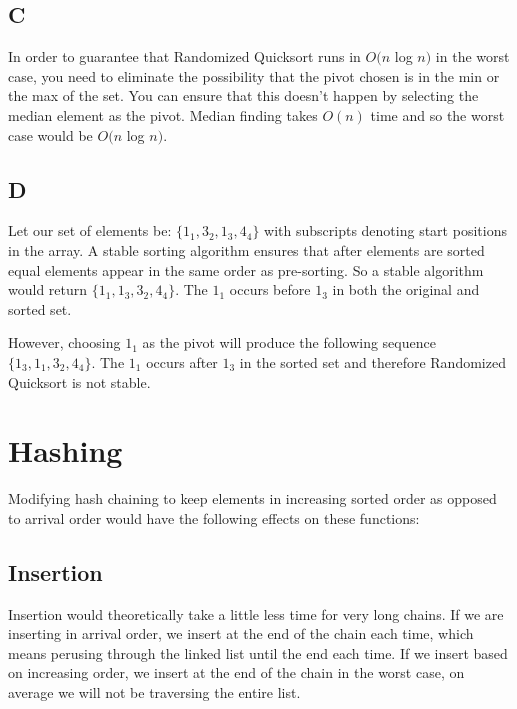 \documentclass[12pt]{article}
\begin{document}
\pagebreak

\subsection{C}

In order to guarantee that Randomized Quicksort runs in $O(n$ log $n)$ in the worst case, you need to eliminate the possibility that the pivot chosen is in the min or the max of the set. You can ensure that this doesn't happen by selecting the median element as the pivot. Median finding takes $O(n)$ time and so the worst case would be $O(n$ log $n)$.

\subsection{D}

Let our set of elements be: $\{1_{1}, 3_{2}, 1_{3}, 4_{4}\}$ with subscripts denoting start positions in the array. A stable sorting algorithm ensures that after elements are sorted equal elements appear in the same order as pre-sorting. So a stable algorithm would return $\{1_{1}, 1_{3}, 3_{2}, 4_{4}\}$. The $1_{1}$ occurs before $1_{3}$ in both the original and sorted set.

However, choosing $1_{1}$ as the pivot will produce the following sequence $\{1_{3}, 1_{1}, 3_{2}, 4_{4}\}$. The $1_{1}$ occurs after $1_{3}$ in the sorted set and therefore Randomized Quicksort is not stable.

\pagebreak

\section{Hashing}

Modifying hash chaining to keep elements in increasing sorted order as opposed to arrival order would have the following effects on these functions:

\subsection{Insertion}

Insertion would theoretically take a little less time for very long chains. If we are inserting in arrival order, we insert at the end of the chain each time, which means perusing through the linked list until the end each time. If we insert based on increasing order, we insert at the end of the chain in the worst case, on average we will not be traversing the entire list.
\end{document}
